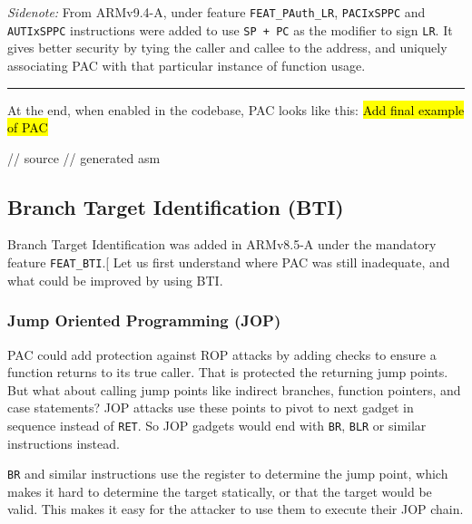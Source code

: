 \documentclass[a4paper, nobind]{templates/ociamthesis}
\newenvironment{Shaded}{\begin{snugshade}}{\end{snugshade}}
\newcommand{\NormalTok}[1]{#1}
\renewenvironment{Shaded}
{
  \vspace{10pt}%
  \begin{snugshade}%
}{%
  \end{snugshade}%
  \vspace{8pt}%
}
\begin{document}
\emph{Sidenote:}
From ARMv9.4-A, under feature \texttt{FEAT\_PAuth\_LR}, \texttt{PACIxSPPC} and \texttt{AUTIxSPPC}
instructions were added to use \texttt{SP\ +\ PC} as the modifier to sign \texttt{LR}.
It gives better security by tying the caller and callee to the address,
and uniquely associating PAC with that particular instance of function usage.

\begin{center}\rule{0.5\linewidth}{0.5pt}\end{center}

At the end, when enabled in the codebase, PAC looks like this:
\hl{Add final example of PAC}

\begin{Shaded}
\begin{Highlighting}[]
\NormalTok{// source}
\NormalTok{// generated asm}
\end{Highlighting}
\end{Shaded}

\subsection{Branch Target Identification (BTI)}\label{bti-bg}

Branch Target Identification was added in ARMv8.5-A under the mandatory feature \texttt{FEAT\_BTI}.{[}\citeproc{ref-arm-feat-names}{9}{]}
Let us first understand where PAC was still inadequate, and what could be improved by using BTI.

\subsubsection{Jump Oriented Programming (JOP)}\label{jump-oriented-programming-jop}

PAC could add protection against ROP attacks by adding checks to ensure a
function returns to its true caller. That is protected the returning jump points.
But what about calling jump points like indirect branches, function pointers,
and case statements? JOP attacks use these points to pivot to next gadget in
sequence instead of \texttt{RET}. So JOP gadgets would end with \texttt{BR}, \texttt{BLR} or similar instructions instead.

\texttt{BR} and similar instructions use the register to determine the jump point, which
makes it hard to determine the target statically, or that the target would be valid.
This makes it easy for the attacker to use them to execute their JOP chain.
\end{document}
